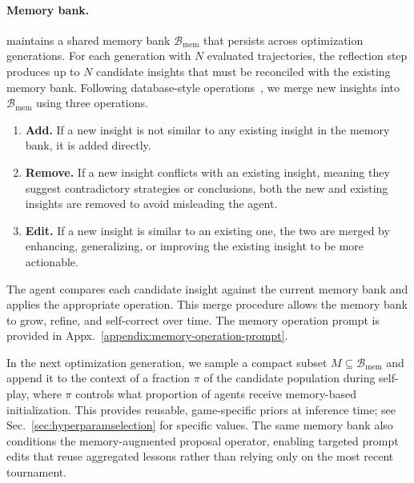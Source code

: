 \paragraph{Memory bank.}
\NAME{} maintains a shared memory bank \(\mathcal{B}_{\text{mem}}\) that persists across optimization generations.
For each generation with $N$ evaluated trajectories, the reflection step produces up to $N$ candidate insights that must be reconciled with the existing memory bank.
Following database-style operations~\citep{Martin1983ManagingDBEnv}, we merge new insights into \(\mathcal{B}_{\text{mem}}\) using three operations.
\begin{enumerate}[leftmargin=1.5em, labelindent=0pt, labelsep=0.5em,topsep=1pt, itemsep=1pt]
\item \textbf{Add.} If a new insight is not similar to any existing insight in the memory bank, it is added directly.
\item \textbf{Remove.} If a new insight conflicts with an existing insight, meaning they suggest contradictory strategies or conclusions, both the new and existing insights are removed to avoid misleading the agent.
\item \textbf{Edit.} If a new insight is similar to an existing one, the two are merged by enhancing, generalizing, or improving the existing insight to be more actionable.
\end{enumerate}
The agent compares each candidate insight against the current memory bank and applies the appropriate operation. This merge procedure allows the memory bank to grow, refine, and self-correct over time. The memory operation prompt is provided in Appx.~\ref{appendix:memory-operation-prompt}.

In the next optimization generation, we sample a compact subset \(M \subseteq \mathcal{B}_{\text{mem}}\) and append it to the context of a fraction $\pi$ of the candidate population during self-play, where $\pi$ controls what proportion of agents receive memory-based initialization. This provides reusable, game-specific priors at inference time; see Sec.~\ref{sec:hyperparamselection} for specific values. 
The same memory bank also conditions the memory-augmented proposal operator, enabling targeted prompt edits that reuse aggregated lessons rather than relying only on the most recent tournament.


